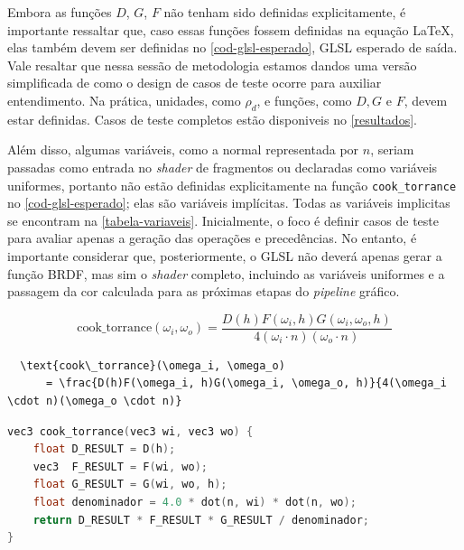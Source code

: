 Embora as funções \(D\), \(G\), \(F\) não tenham sido definidas explicitamente, é importante ressaltar que, caso essas funções fossem definidas na equação \LaTeX{}, elas também devem ser definidas no \autoref{cod-glsl-esperado}, GLSL esperado de saída. Vale resaltar que nessa sessão de metodologia estamos dandos uma versão simplificada  de como o design de casos de teste ocorre para auxiliar entendimento. Na prática, unidades, como $\rho_d$, e funções, como $D,G$ e $F$, devem estar definidas. Casos de teste completos estão disponiveis no \autoref{resultados}.


Além disso, algumas variáveis, como a normal representada por \( n \), seriam passadas como entrada no \textit{shader} de fragmentos ou declaradas como variáveis uniformes, portanto não estão definidas explicitamente na função \texttt{cook\_torrance} no \autoref{cod-glsl-esperado}; elas são variáveis implícitas. Todas as variáveis implicitas se encontram na \autoref{tabela-variaveis}. Inicialmente, o foco é definir casos de teste para avaliar apenas a geração das operações e precedências. No entanto, é importante considerar que, posteriormente, o GLSL não deverá apenas gerar a função BRDF, mas sim o \textit{shader} completo, incluindo as variáveis uniformes e a passagem da cor calculada para as próximas etapas do \textit{pipeline} gráfico.


\begin{equation} \label{eq-cook-torrance}
  \text{cook\_torrance}(\omega_i, \omega_o) = \frac{D(h)F(\omega_i, h)G(\omega_i, \omega_o, h)}{4(\omega_i \cdot n)(\omega_o \cdot n)}
\end{equation}


\begin{codigo}[H]
\caption{\small Entrada em \LaTeX\  (Cook-Torrance BRDF).}
\label{cod-input-latex}
\begin{lstlisting}
  \text{cook\_torrance}(\omega_i, \omega_o)
      = \frac{D(h)F(\omega_i, h)G(\omega_i, \omega_o, h)}{4(\omega_i \cdot n)(\omega_o \cdot n)}
\end{lstlisting}
\end{codigo}


\begin{codigo}[H]
\caption{\small Saída em GLSL esperada (Cook-Torrance BRDF).}
\label{cod-glsl-esperado}
\begin{lstlisting}[language=C]
vec3 cook_torrance(vec3 wi, vec3 wo) {
    float D_RESULT = D(h);
    vec3  F_RESULT = F(wi, wo);
    float G_RESULT = G(wi, wo, h);
    float denominador = 4.0 * dot(n, wi) * dot(n, wo);
    return D_RESULT * F_RESULT * G_RESULT / denominador;
}
\end{lstlisting}
\end{codigo}



